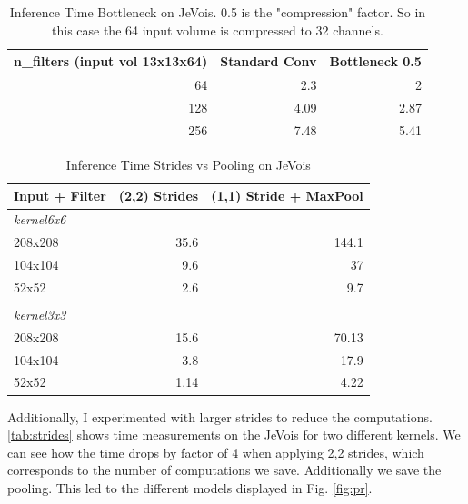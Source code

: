 \documentclass{article}
\begin{document}
\begin{table}[htbp]

	\caption{Inference Time Bottleneck on JeVois. 0.5 is the "compression" factor. So in this case the 64 input volume is compressed to 32 channels.}
	\begin{center}
		\begin{tabular}{|r|r|r|}
			\hline
			\multicolumn{1}{|l|}{\textbf{n\_filters (input vol 13x13x64)}} & \multicolumn{1}{l|}{\textbf{Standard Conv}} & \multicolumn{1}{l|}{\textbf{Bottleneck 0.5}} \\ \hline
			64 & 2.3 & 2 \\ \hline
			128 & 4.09 & 2.87 \\ \hline
			256 & 7.48 & 5.41 \\ \hline
		\end{tabular}
	\end{center}
	\label{tab:bottleneck}
\end{table}

\begin{table}[htbp]
	\caption{Inference Time Strides vs Pooling on JeVois}
	\begin{center}
		\begin{tabular}{|l|r|r|}
			\hline
			\textbf{Input + Filter} & \multicolumn{1}{l|}{\textbf{(2,2) Strides}} & \multicolumn{1}{l|}{\textbf{(1,1) Stride + MaxPool}} \\ \hline
			\textit{kernel6x6} & \multicolumn{1}{l|}{} & \multicolumn{1}{l|}{} \\ \hline
			208x208 & 35.6 & 144.1 \\ \hline
			104x104 & 9.6 & 37 \\ \hline
			52x52 & 2.6 & 9.7 \\ \hline
			& \multicolumn{1}{l|}{} & \multicolumn{1}{l|}{} \\ \hline
			\textit{kernel3x3} & \multicolumn{1}{l|}{} & \multicolumn{1}{l|}{} \\ \hline
			208x208 & 15.6 & 70.13 \\ \hline
			104x104 & 3.8 & 17.9 \\ \hline
			52x52 & 1.14 & 4.22 \\ \hline
		\end{tabular}
	\end{center}
	\label{tab:strides}
\end{table}

Additionally, I experimented with larger strides to reduce the computations. \autoref{tab:strides} shows time measurements on the JeVois for two different kernels. We can see how the time drops by factor of 4 when applying 2,2 strides, which corresponds to the number of computations we save. Additionally we save the pooling. This led to the different models displayed in Fig. \ref{fig:pr}.
\end{document}
